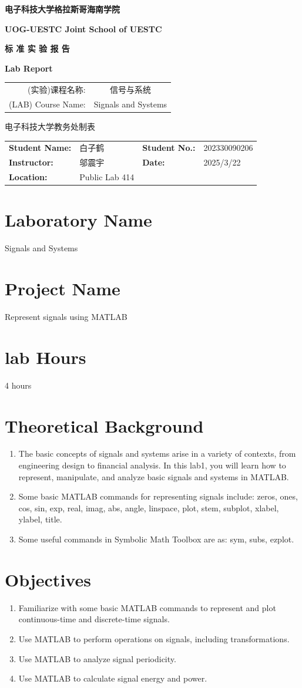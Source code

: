 \documentclass[12pt]{article}
\makeatletter
\renewcommand{\maketitle}{
    \begin{titlepage}
        \begin{center}
            \vspace*{0cm}
            
            {\huge \kaishu \textbf{电子科技大学格拉斯哥海南学院}}
            
            \vspace{0.5cm}
            {\Large \textbf{UOG-UESTC Joint School of UESTC}}
            
            \vspace{4cm}
            
            {\Huge \kaishu \textbf{标 准 实 验 报 告}}
            
            \vspace{0.5cm}
            {\Large \textbf{Lab Report}}
            
            \vspace{4cm}
            
            \begin{center}
            \begin{tabular}{rc}
                \kaishu (实验)课程名称: & \kaishu 信号与系统 \\[0.5cm]
                (LAB) Course Name: & Signals and Systems
            \end{tabular}
            \end{center}
            
            \vfill
            
            {\large \kaishu 电子科技大学教务处制表}
        \end{center}
    \end{titlepage}
    
    \noindent
    \begin{tabular}{ll@{\hspace{4cm}}ll}
        \textbf{Student Name:} & 白子鹤 & \textbf{Student No.:} & 202330090206 \\[0.5cm]
        \textbf{Instructor:} & 邬震宇 & \textbf{Date:} & 2025/3/22 \\[0.5cm]
        \textbf{Location:} & Public Lab 414
    \end{tabular}
    
    \vspace{1cm}
}
\makeatother
\begin{document}
\maketitle

\section{Laboratory Name}
Signals and Systems

\section{Project Name}
Represent signals using MATLAB

\section{lab Hours}
4 hours

\section{Theoretical Background}
\begin{enumerate}[leftmargin=2em]
    \item The basic concepts of signals and systems arise in a variety of contexts, from engineering design to financial analysis. In this lab1, you will learn how to represent, manipulate, and analyze basic signals and systems in MATLAB.
    \item Some basic MATLAB commands for representing signals include: zeros, ones, cos, sin, exp, real, imag, abs, angle, linspace, plot, stem, subplot, xlabel, ylabel, title.
    \item Some useful commands in Symbolic Math Toolbox are as: sym, subs, ezplot.
\end{enumerate}


\section{Objectives}
\begin{enumerate}
    \item Familiarize with some basic MATLAB commands to represent and plot continuous-time and discrete-time signals.
    \item Use MATLAB to perform operations on signals, including transformations.
    \item Use MATLAB to analyze signal periodicity.
    \item Use MATLAB to calculate signal energy and power.
\end{enumerate}
\end{document}
